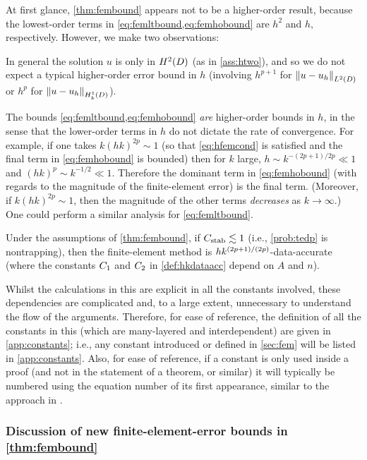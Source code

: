 \label{rem:higherorder}
At first glance, \cref{thm:fembound} appears not to be a higher-order result, because the lowest-order terms in \cref{eq:femltbound,eq:femhobound} are $h^2$ and $h,$  respectively. However, we make two observations:
\ben
\item In general the solution $u$ is only in $\HtD$ (as in \cref{ass:htwo}), and so we do not expect a typical higher-order error bound in $h$ (involving $h^{p+1}$ for $\NLtD{u-\uh}$ or $h^p$ for $\NHokD{u-\uh}$).
  \item The bounds \cref{eq:femltbound,eq:femhobound} \emph{are} higher-order bounds in $h$, in the sense that the lower-order terms in $h$ do not dictate the rate of convergence. For example, if one takes $k(hk)^{2p} \sim 1$ (so that \cref{eq:hfemcond} is satisfied and the final term in \cref{eq:femhobound} is bounded) then for $k$ large, $h \sim k^{-(2p+1)/2p} \ll 1$ and $(hk)^p \sim k^{-1/2} \ll 1$. Therefore the dominant term in \cref{eq:femhobound} (with regards to the magnitude of the finite-element error) is the final term. (Moreover, if $k(hk)^{2p} \sim 1$, then the magnitude of the other terms \emph{decreases} as $k \rightarrow \infty$.) One could perform a similar analysis for \cref{eq:femltbound}.
\een
\ere

\label{cor:dataacc}
Under the assumptions of \cref{thm:fembound}, if $C_{\mathrm{stab}} \lesssim 1$ (i.e., \cref{prob:tedp} is nontrapping), then the finite-element method is $hk^{(2p+1)/(2p)}$-data-accurate (where the constants $C_{1}$ and $C_{2}$ in \cref{def:hkdataacc} depend on $A$ and $n$).
\eco

Whilst the calculations in this  are explicit in all the constants involved, these dependencies are complicated and, to a large extent, unnecessary to understand the flow of the arguments. Therefore, for ease of reference, the definition of all the constants in this  (which are many-layered and interdependent) are given in \cref{app:constants}; i.e., any constant introduced or defined in \cref{sec:fem} will be listed in \cref{app:constants}. Also, for ease of reference, if a constant is only used inside a proof (and not in the statement of a theorem, or similar) it will typically be numbered using the equation number of its first appearance, similar to the approach in \cite{ChScTe:13}.



\subsubsection{Discussion of new finite-element-error bounds in \cref{thm:fembound}}

